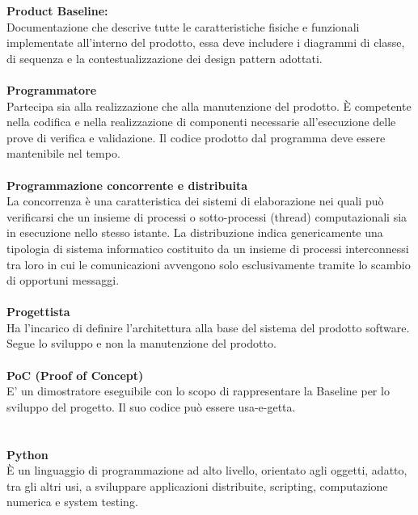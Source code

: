 \textbf{Product Baseline:}\\ 
Documentazione che descrive tutte le caratteristiche fisiche e funzionali implementate all'interno del prodotto, essa deve includere i diagrammi di classe, di sequenza e la contestualizzazione dei design pattern adottati. \\ \\
\textbf{Programmatore}\\ 
Partecipa sia alla realizzazione che alla manutenzione del prodotto. È competente nella codifica e nella realizzazione di componenti necessarie all'esecuzione delle prove di verifica e validazione. Il codice prodotto dal programma deve essere mantenibile nel tempo.\\ \\
\textbf{Programmazione concorrente e distribuita}\\
La concorrenza è una caratteristica dei sistemi di elaborazione nei quali può verificarsi che un insieme di processi o sotto-processi (thread) computazionali sia in esecuzione nello stesso istante. La distribuzione indica genericamente una tipologia di sistema informatico costituito da un insieme di processi interconnessi tra loro in cui le comunicazioni avvengono solo esclusivamente tramite lo scambio di opportuni messaggi. \\ \\
\textbf{Progettista}\\ 
Ha l'incarico di definire l'architettura alla base del sistema del prodotto software. Segue lo sviluppo e non la manutenzione del prodotto. \\ \\
\textbf{PoC (Proof of Concept)}\\
E' un dimostratore eseguibile con lo scopo di rappresentare la Baseline per lo sviluppo del progetto. Il suo codice può essere usa-e-getta. \\ \\ \\ %
\textbf{Python}\\
È un linguaggio di programmazione ad alto livello, orientato agli oggetti, adatto, tra gli altri usi, a sviluppare applicazioni distribuite, scripting, computazione numerica e system testing. \\ \\
\clearpage